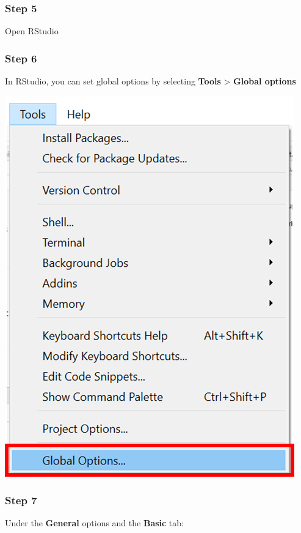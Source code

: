 \documentclass[
  letterpaper,
  DIV=11,
  numbers=noendperiod]{scrreprt}
\begin{document}
\hypertarget{step-5-1}{%
\subsubsection{Step 5}\label{step-5-1}}

Open RStudio

\hypertarget{step-6-1}{%
\subsubsection{Step 6}\label{step-6-1}}

In RStudio, you can set global options by selecting \textbf{Tools}
\textgreater{} \textbf{Global options}

\includegraphics{./images/paste-D0B6CCF0.png}

\hypertarget{step-7}{%
\subsubsection{Step 7}\label{step-7}}

Under the \textbf{General} options and the \textbf{Basic} tab:
\end{document}

